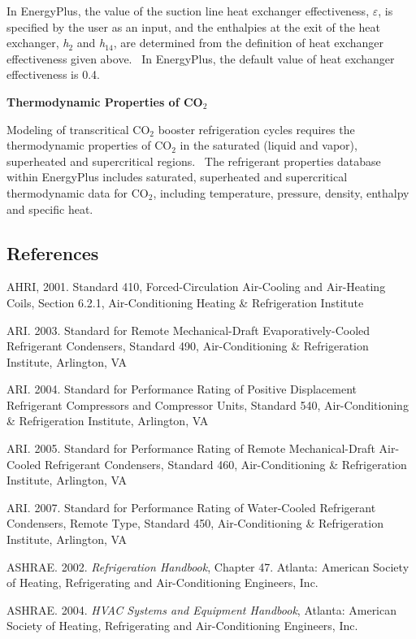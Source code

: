 In EnergyPlus, the value of the suction line heat exchanger effectiveness, \(\varepsilon\), is specified by the user as an input, and the enthalpies at the exit of the heat exchanger, \emph{h}\(_{2}\) and \emph{h}\(_{14}\), are determined from the definition of heat exchanger effectiveness given above.~ In EnergyPlus, the default value of heat exchanger effectiveness is 0.4.

\textbf{Thermodynamic Properties of CO\(_{2}\)}

Modeling of transcritical CO\(_{2}\) booster refrigeration cycles requires the thermodynamic properties of CO\(_{2}\) in the saturated (liquid and vapor), superheated and supercritical regions.~ The refrigerant properties database within EnergyPlus includes saturated, superheated and supercritical thermodynamic data for CO\(_{2}\), including temperature, pressure, density, enthalpy and specific heat.

\subsection{References}\label{references-040}

AHRI, 2001. Standard 410, Forced-Circulation Air-Cooling and Air-Heating Coils, Section 6.2.1, Air-Conditioning Heating \& Refrigeration Institute

ARI. 2003. Standard for Remote Mechanical-Draft Evaporatively-Cooled Refrigerant Condensers, Standard 490, Air-Conditioning \& Refrigeration Institute, Arlington, VA

ARI. 2004. Standard for Performance Rating of Positive Displacement Refrigerant Compressors and Compressor Units, Standard 540, Air-Conditioning \& Refrigeration Institute, Arlington, VA

ARI. 2005. Standard for Performance Rating of Remote Mechanical-Draft Air-Cooled Refrigerant Condensers, Standard 460, Air-Conditioning \& Refrigeration Institute, Arlington, VA

ARI. 2007. Standard for Performance Rating of Water-Cooled Refrigerant Condensers, Remote Type, Standard 450, Air-Conditioning \& Refrigeration Institute, Arlington, VA

ASHRAE. 2002. \emph{Refrigeration Handbook}, Chapter 47. Atlanta: American Society of Heating, Refrigerating and Air-Conditioning Engineers, Inc.

ASHRAE. 2004. \emph{HVAC Systems and Equipment Handbook}, Atlanta: American Society of Heating, Refrigerating and Air-Conditioning Engineers, Inc.

